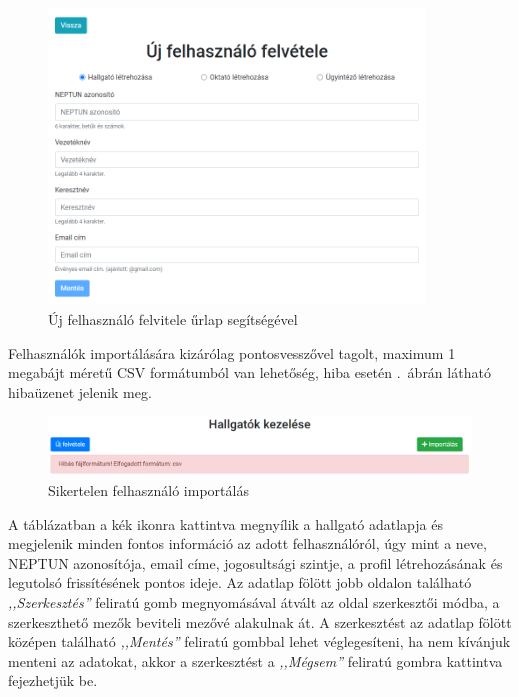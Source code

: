 \documentclass[
]{thesis-ekf}
\theoremstyle{definition}
\theoremstyle{remark}
\begin{document}
	\begin{figure}[!h]
		\centering
		\includegraphics[width=10cm]{kepek/screenshots/ugyintezo_uj_felhasznalo.png}
		\caption{Új felhasználó felvitele űrlap segítségével}
		\label{fig:ugyint_felhasznalo_form}
	\end{figure}
	
	Felhasználók importálására kizárólag pontosvesszővel tagolt, maximum 1 megabájt méretű CSV formátumból van lehetőség, hiba esetén \az{\ref{fig:ugyint_felhasznalo_import_hiba}}.~ábrán látható hibaüzenet jelenik meg.
	
	\begin{figure}[!h]
		\centering
		\includegraphics[width=15cm]{kepek/screenshots/ugyintezo_felhasznalo_import_hiba.png}
		\caption{Sikertelen felhasználó importálás}
		\label{fig:ugyint_felhasznalo_import_hiba}
	\end{figure}
	
	A táblázatban a kék ikonra kattintva megnyílik a hallgató adatlapja és megjelenik minden fontos információ az adott felhasználóról, úgy mint a neve, NEPTUN azonosítója, email címe, jogosultsági szintje, a profil létrehozásának és legutolsó frissítésének pontos ideje. Az adatlap fölött jobb oldalon található \emph{,,Szerkesztés''} feliratú gomb megnyomásával átvált az oldal szerkesztői módba, a szerkeszthető mezők beviteli mezővé alakulnak át. A szerkesztést az adatlap fölött középen található \emph{,,Mentés''} feliratú gombbal lehet véglegesíteni, ha nem kívánjuk menteni az adatokat, akkor a szerkesztést a \emph{,,Mégsem''} feliratú gombra kattintva fejezhetjük be.
	
\end{document}
